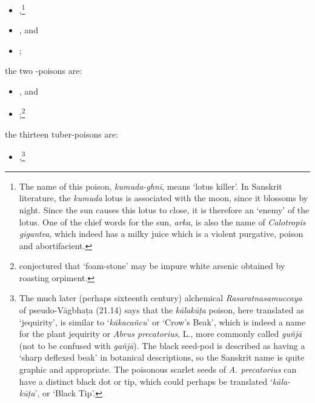\begin{translation}
\begin{itemize}
        \item {},\footnote{The name of this poison, \emph{kumuda-ghnī}, means 
            `lotus
        killer'.  In Sanskrit literature, the \emph{kumuda} lotus is associated
        with the moon, since it blossoms by night.  Since the sun causes this lotus
        to close, it is therefore an `enemy' of the lotus.  One of the chief words
        for the sun, \emph{arka}, is also the name of \emph{Calotropis gigantea},
        which indeed has a milky juice which is a violent purgative, poison and
        abortifacient.}
        \item {},
        and
        \item {};
            \end{itemize}
        
        \item
        the two -poisons are:
              \begin{itemize}
            
        \item {}, and
        \item {};\footnote{\citet[38--42]{dutt-1922} conjectured that
        `foam-stone' may be impure white arsenic obtained by roasting orpiment.}
            \end{itemize}
        \item
        the thirteen tuber-poisons are:
        \begin{itemize}
             \item {},\footnote{The much later (perhaps sixteenth century) alchemical
        \emph{Rasa\-ratna\-samuccaya} of pseudo-Vāgbhaṭa (21.14) says that the
        \emph{kāla\-kūṭa} poison, here translated as `jequirity', is similar to
        `\emph{kāka\-cañcu}' or `Crow's Beak', which is indeed a name for the
        plant jequirity or
        \emph{Abrus precatorius}, L., more commonly called \emph{guñjā} (not to
        be confused with \emph{gañjā}). The black seed-pod is described as
        having a `sharp deflexed beak' in botanical descriptions, so the
        Sanskrit name is quite graphic and appropriate. The poisonous scarlet
        seeds of \emph{A. precatorius} can have a distinct black dot or tip,
        which could perhaps be translated `\emph{kāla-kūṭa}', or `Black Tip'.
        
}
\end{itemize}
\end{translation}
